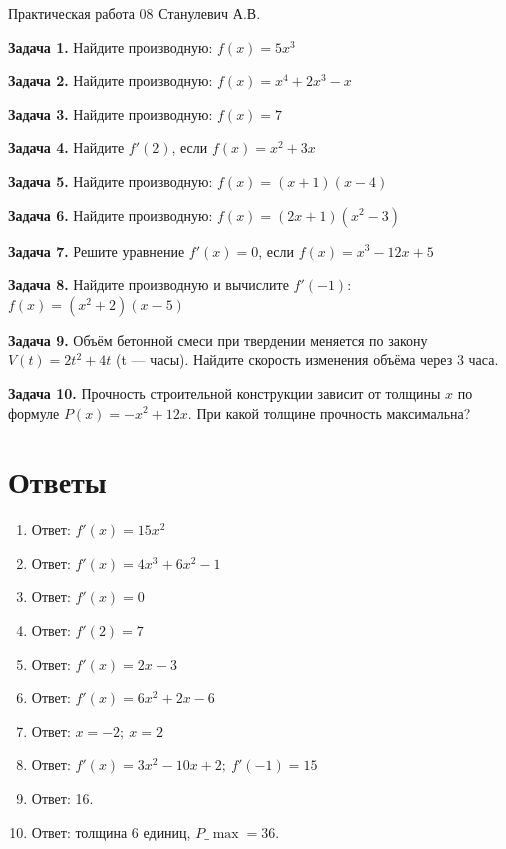 \documentclass{umk-matematika}
\begin{document}
\maketitlepage
    {Практическая работа 08}
    {}
    {Станулевич А.В.}

\textbf{Задача 1.} Найдите производную: $f(x) = 5x^3$\par\vspace{10pt}
\textbf{Задача 2.} Найдите производную: $f(x) = x^4 + 2x^3 - x$\par\vspace{10pt}
\textbf{Задача 3.} Найдите производную: $f(x) = 7$\par\vspace{10pt}
\textbf{Задача 4.} Найдите $f'(2)$, если $f(x) = x^2 + 3x$\par\vspace{10pt}
\textbf{Задача 5.} Найдите производную: $f(x) = (x + 1)(x - 4)$\par\vspace{10pt}
\textbf{Задача 6.} Найдите производную: $f(x) = (2x + 1)(x^2 - 3)$\par\vspace{10pt}
\textbf{Задача 7.} Решите уравнение $f'(x) = 0$, если $f(x) = x^3 - 12x + 5$\par\vspace{10pt}
\textbf{Задача 8.} Найдите производную и вычислите $f'(-1)$: $f(x) = (x^2 + 2)(x - 5)$\par\vspace{10pt}
\textbf{Задача 9.} Объём бетонной смеси при твердении меняется по закону $V(t) = 2t^2 + 4t$ (t — часы). Найдите скорость изменения объёма через 3 часа.\par\vspace{10pt}
\textbf{Задача 10.} Прочность строительной конструкции зависит от толщины $x$ по формуле $P(x) = -x^2 + 12x$. При какой толщине прочность максимальна?\par\vspace{10pt}
\newpage
\section*{Ответы}

\begin{enumerate}
  \item Ответ: $f'(x) = 15x^2$
  \item Ответ: $f'(x) = 4x^3 + 6x^2 - 1$
  \item Ответ: $f'(x) = 0$
  \item Ответ: $f'(2) = 7$
  \item Ответ: $f'(x) = 2x - 3$
  \item Ответ: $f'(x) = 6x^2 + 2x - 6$
  \item Ответ: $x = -2;\ x = 2$
  \item Ответ: $f'(x) = 3x^2 - 10x + 2;\ f'(-1) = 15$
  \item Ответ: 16.
  \item Ответ: толщина 6 единиц, $P\_{\max} = 36$.
\end{enumerate}
\end{document}
